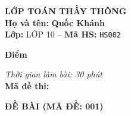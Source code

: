 \noindent
\begin{tcolorbox}[colback=white,colframe=black,arc=0mm,boxrule=0.8pt,top=4pt,bottom=4pt,left=6pt,right=6pt]
	\begin{minipage}[c]{0.44\textwidth}
		{\bfseries\large LỚP TOÁN THẦY THÔNG}\\[3pt]
		\textbf{Họ và tên:} \textbf{\large Quốc Khánh}\\[3pt]
		\textbf{Lớp:} LỚP 10 \quad -- \quad \textbf{Mã HS:} \texttt{HS002}
	\end{minipage}
	\hfill
	\begin{minipage}[c]{0.22\textwidth}
		\begin{tcolorbox}[colback=white,colframe=black,arc=0mm,boxrule=0.6pt,height=1.8cm,halign=center,valign=top,top=2pt]
			{\bfseries\normalsize Điểm}
		\end{tcolorbox}
	\end{minipage}
	\hfill
	\begin{minipage}[c]{0.30\textwidth}
		\raggedleft
		\textit{Thời gian làm bài: 30 phút}\\[4pt]
		\textbf{Mã đề thi:} 
	\end{minipage}
\end{tcolorbox}
\vspace{0.25cm}

\noindent\textbf{\large ĐỀ BÀI (MÃ ĐỀ: 001)}
\vspace{0.1cm}

